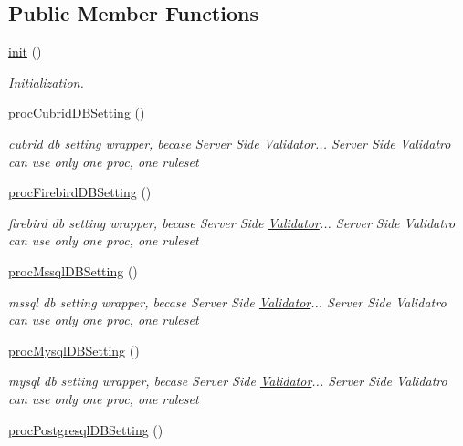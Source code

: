 \subsection*{Public Member Functions}
\begin{DoxyCompactItemize}
\item 
\hyperlink{classinstallController_a99641d12063ae41f5a787ac159853c83}{init} ()
\begin{DoxyCompactList}\small\item\em Initialization. \end{DoxyCompactList}\item 
\hyperlink{classinstallController_a275ce5057c0171e2582739506cec99cb}{proc\-Cubrid\-D\-B\-Setting} ()
\begin{DoxyCompactList}\small\item\em cubrid db setting wrapper, becase Server Side \hyperlink{classValidator}{Validator}... Server Side Validatro can use only one proc, one ruleset \end{DoxyCompactList}\item 
\hyperlink{classinstallController_a243cf71fa5653d7cbf2d5583effefb95}{proc\-Firebird\-D\-B\-Setting} ()
\begin{DoxyCompactList}\small\item\em firebird db setting wrapper, becase Server Side \hyperlink{classValidator}{Validator}... Server Side Validatro can use only one proc, one ruleset \end{DoxyCompactList}\item 
\hyperlink{classinstallController_a583b9b74e93bf6a762a7bd6d08e2b23a}{proc\-Mssql\-D\-B\-Setting} ()
\begin{DoxyCompactList}\small\item\em mssql db setting wrapper, becase Server Side \hyperlink{classValidator}{Validator}... Server Side Validatro can use only one proc, one ruleset \end{DoxyCompactList}\item 
\hyperlink{classinstallController_a9d46a8423a90109be5dc1edf8238630e}{proc\-Mysql\-D\-B\-Setting} ()
\begin{DoxyCompactList}\small\item\em mysql db setting wrapper, becase Server Side \hyperlink{classValidator}{Validator}... Server Side Validatro can use only one proc, one ruleset \end{DoxyCompactList}\item 
\hyperlink{classinstallController_afc3f4c6259e4be427531fca748c98c49}{proc\-Postgresql\-D\-B\-Setting} ()

\end{DoxyCompactItemize}
